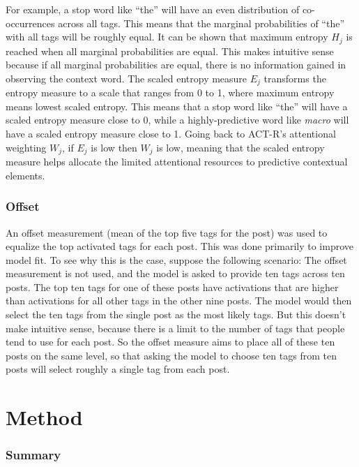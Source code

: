 \documentclass[10pt,letterpaper]{article}
\begin{document}
For example, a stop word like ``the'' will have an even distribution of co-occurrences across all tags.
This means that the marginal probabilities of ``the'' with all tags will be roughly equal.
It can be shown that maximum entropy $H_{j}$ is reached when all marginal probabilities are equal.
This makes intuitive sense because if all marginal probabilities are equal, there is no information gained in observing the context word.
The scaled entropy measure $E_{j}$ transforms the entropy measure to a scale that ranges from 0 to 1, where maximum entropy means lowest scaled entropy.
This means that a stop word like ``the'' will have a scaled entropy measure close to 0, while a highly-predictive word like \emph{macro} will have a scaled entropy measure close to 1.
Going back to ACT-R's attentional weighting $W_{j}$, if $E_{j}$ is low then $W_{j}$ is low, meaning that the scaled entropy measure helps allocate the limited attentional resources to predictive contextual elements.

\subsubsection{Offset}

An offset measurement (mean of the top five tags for the post) was used to equalize the top activated tags for each post.
This was done primarily to improve model fit.
To see why this is the case, suppose the following scenario:
The offset measurement is not used, and the model is asked to provide ten tags across ten posts.
The top ten tags for one of these posts have activations that are higher than activations for all other tags in the other nine posts.
The model would then select the ten tags from the single post as the most likely tags.
But this doesn't make intuitive sense, because there is a limit to the number of tags that people tend to use for each post.
So the offset measure aims to place all of these ten posts on the same level, so that asking the model to choose ten tags from ten posts will select roughly a single tag from each post.

\section{Method}

\subsubsection{Summary}
\end{document}
